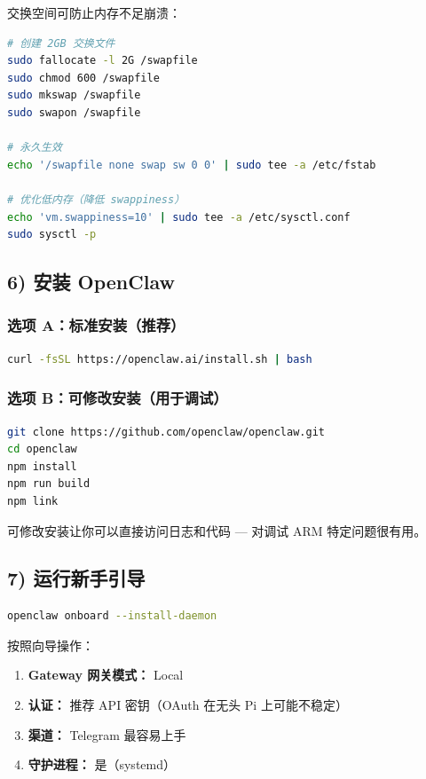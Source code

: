 交换空间可防止内存不足崩溃：

\begin{lstlisting}[language=bash]
# 创建 2GB 交换文件
sudo fallocate -l 2G /swapfile
sudo chmod 600 /swapfile
sudo mkswap /swapfile
sudo swapon /swapfile

# 永久生效
echo '/swapfile none swap sw 0 0' | sudo tee -a /etc/fstab

# 优化低内存（降低 swappiness）
echo 'vm.swappiness=10' | sudo tee -a /etc/sysctl.conf
sudo sysctl -p
\end{lstlisting}


\subsection{6) 安装 OpenClaw}


\subsubsection{选项 A：标准安装（推荐）}


\begin{lstlisting}[language=bash]
curl -fsSL https://openclaw.ai/install.sh | bash
\end{lstlisting}


\subsubsection{选项 B：可修改安装（用于调试）}


\begin{lstlisting}[language=bash]
git clone https://github.com/openclaw/openclaw.git
cd openclaw
npm install
npm run build
npm link
\end{lstlisting}


可修改安装让你可以直接访问日志和代码 — 对调试 ARM 特定问题很有用。

\subsection{7) 运行新手引导}


\begin{lstlisting}[language=bash]
openclaw onboard --install-daemon
\end{lstlisting}


按照向导操作：

\begin{enumerate}
  \item \textbf{Gateway 网关模式：} Local
  \item \textbf{认证：} 推荐 API 密钥（OAuth 在无头 Pi 上可能不稳定）
  \item \textbf{渠道：} Telegram 最容易上手
  \item \textbf{守护进程：} 是（systemd）
\end{enumerate}


